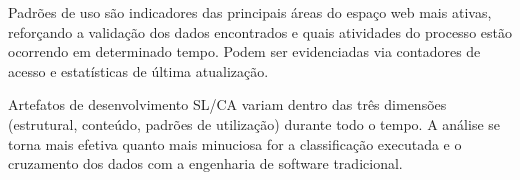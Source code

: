 % 



Padrões de uso são indicadores das principais áreas do espaço web mais ativas, reforçando a validação dos dados encontrados e quais atividades do processo estão ocorrendo em determinado tempo. Podem ser evidenciadas via contadores de acesso e estatísticas de última atualização.



Artefatos de desenvolvimento SL/CA variam dentro das três dimensões (estrutural, conteúdo, padrões de utilização) durante todo o tempo. A análise se torna mais efetiva quanto mais minuciosa for a classificação executada e o cruzamento dos dados com a engenharia de software tradicional.

